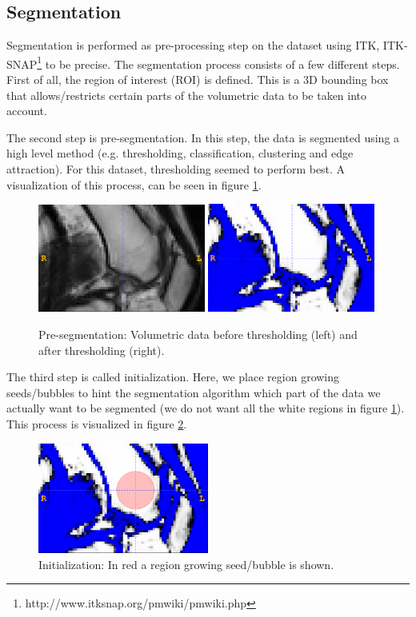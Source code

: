 \documentclass{article}
\begin{document}
\subsection{Segmentation}
Segmentation is performed as pre-processing step on the dataset using ITK, ITK-SNAP\footnote{http://www.itksnap.org/pmwiki/pmwiki.php} to be precise. The segmentation process consists of a few different steps. First of all, the region of interest (ROI) is defined. This is a 3D bounding box that allows/restricts certain parts of the volumetric data to be taken into account.

The second step is pre-segmentation. In this step, the data is segmented using a high level method (e.g. thresholding, classification, clustering and edge attraction). For this dataset, thresholding seemed to perform best. A visualization of this process, can be seen in figure \ref{fig:presegmentation}.
\begin{figure}[H]
    \centering
    \includegraphics[width=0.49\textwidth]{graphics/pre_segmentation_1.png}
    \includegraphics[width=0.49\textwidth]{graphics/presegmentation_2.png}
    \caption{Pre-segmentation: Volumetric data before thresholding (left) and after thresholding (right).}
    \label{fig:presegmentation}
\end{figure}

The third step is called initialization. Here, we place region growing seeds/bubbles to hint the segmentation algorithm which part of the data we actually want to be segmented (we do not want all the white regions in figure \ref{fig:presegmentation}). This process is visualized in figure \ref{fig:initialization}.
\begin{figure}[H]
    \centering
    \includegraphics[width=0.5\textwidth]{graphics/initialization.png}
    \caption{Initialization: In red a region growing seed/bubble is shown.}
    \label{fig:initialization}
\end{figure}
\end{document}
